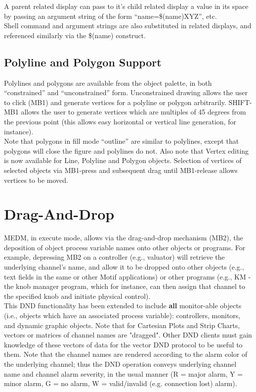 \noindent A parent related display can pass to it's child related display a
value in its space by passing an argument string of the form
``name=\$(name)XYZ'', etc.\\

\noindent Shell command and argument strings are also substituted in related
displays, and referenced similarly via the \$(name) construct.\\

\subsection{Polyline and Polygon Support}

Polylines and polygons are available from
the object palette, in both ``constrained'' and ``unconstrained''
form.  Unconstrained drawing allows the user to click (MB1) and
generate vertices for a polyline or polygon arbitrarily.
SHIFT-MB1 allows the user to generate vertices which are multiples
of 45 degrees from the previous point (this allows easy horizontal
or vertical line generation, for instance).\\

\noindent Note that polygons in fill mode ``outline'' are similar to polylines,
except that polygons will close the figure and polylines do not.
Also note that Vertex editing is now available for Line, Polyline
and Polygon objects.  Selection of vertices of selected objects
via MB1-press and subsequent drag until MB1-release allows vertices
to be moved.\\



\section{Drag-And-Drop}

MEDM, in execute mode, allows via the drag-and-drop mechanism (MB2),
the deposition of object process variable names onto other
objects or programs.  For example, depressing MB2 on a controller
(e.g., valuator) will retrieve the underlying channel's name, and allow
it to be dropped onto other objects (e.g., text fields in the same or other
Motif applications) or other programs (e.g., KM - the knob manager program,
which for instance, can then assign that channel to the specified knob
and initiate physical control).\\

\noindent This DND functionality has been extended to include {\bf all}
monitor-able objects (i.e., objects which have an associated process
variable): controllers, monitors, and dynamic graphic objects.  Note
that for Cartesian Plots and Strip Charts, vectors or matrices of
channel names are "dragged".  Other DND clients must gain knowledge of
these vectors of data for the vector DND protocol to be useful to them.
Note that the channel names are rendered according to the alarm color
of the underlying channel; thus the DND operation conveys underlying
channel name and channel alarm severity, in the usual manner (R = major
alarm, Y = minor alarm, G = no alarm, W = valid/invalid (e.g. connection
lost) alarm).\\




